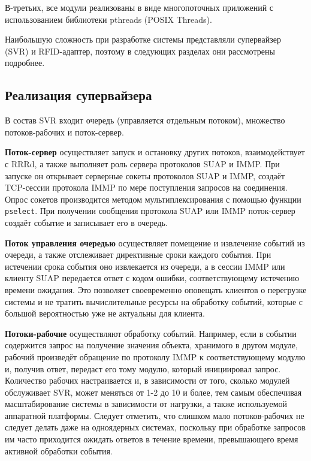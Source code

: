 В-третьих, все модули реализованы в виде многопоточных приложений с использованием библиотеки pthreads (POSIX Threads).

Наибольшую сложность при разработке системы представляли супервайзер (SVR) и RFID-адаптер, поэтому в следующих разделах они рассмотрены подробнее.



\subsection{Реализация супервайзера}

В состав SVR входит очередь (управляется отдельным потоком), множество потоков-рабочих и поток-сервер.

\textbf{Поток-сервер} осуществляет запуск и остановку других потоков, взаимодействует с RRRd, а также выполняет роль сервера протоколов SUAP и IMMP. При запуске он открывает серверные сокеты протоколов SUAP и IMMP, создаёт TCP-сессии протокола IMMP по мере поступления запросов на соединения. Опрос сокетов производится методом мультиплексирования с помощью функции \texttt{pselect}. При получении сообщения протокола SUAP или IMMP поток-сервер создаёт событие и записывает его в очередь.

\textbf{Поток управления очередью} осуществляет помещение и извлечение событий из очереди, а также отслеживает директивные сроки каждого события. При истечении срока события оно извлекается из очереди, а в сессии IMMP или клиенту SUAP передается ответ с кодом ошибки, соответствующему истечению времени ожидания. Это позволяет своевременно оповещать клиентов о перегрузке системы и не тратить вычислительные ресурсы на обработку событий, которые с большой вероятностью уже не актуальны для клиента.

\textbf{Потоки-рабочие} осуществляют обработку событий. Например, если в событии содержится запрос на получение значения объекта, хранимого в другом модуле, рабочий произведёт обращение по протоколу IMMP к соответствующему модулю и, получив ответ, передаст его тому модулю, который инициировал запрос. Количество рабочих настраивается и, в зависимости от того, сколько модулей обслуживает SVR, может меняться от 1-2 до 10 и более, тем самым обеспечивая масштабирование системы в зависимости от нагрузки, а также используемой аппаратной платформы. Следует отметить, что слишком мало потоков-рабочих не следует делать даже на одноядерных системах, поскольку при обработке запросов им часто приходится ожидать ответов в течение времени, превышающего время активной обработки события.



